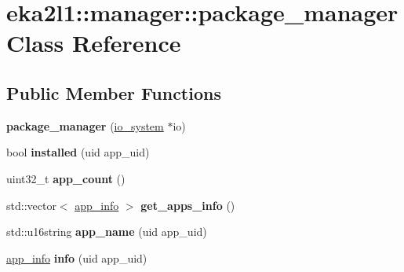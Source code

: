 \hypertarget{classeka2l1_1_1manager_1_1package__manager}{}\section{eka2l1\+:\+:manager\+:\+:package\+\_\+manager Class Reference}
\label{classeka2l1_1_1manager_1_1package__manager}
\subsection*{Public Member Functions}
\begin{DoxyCompactItemize}
\item 
\mbox{\label{classeka2l1_1_1manager_1_1package__manager_ac16df897346eb911aa5f5313ce0918c9}} 
{\bfseries package\+\_\+manager} (\mbox{\hyperlink{classeka2l1_1_1io__system}{io\+\_\+system}} $\ast$io)
\item 
\mbox{\label{classeka2l1_1_1manager_1_1package__manager_a5f26e1e8f16540f7dcc29428c35f3742}} 
bool {\bfseries installed} (uid app\+\_\+uid)
\item 
\mbox{\label{classeka2l1_1_1manager_1_1package__manager_a1e3fb359485ccef87329c592b29d48c6}} 
uint32\+\_\+t {\bfseries app\+\_\+count} ()
\item 
\mbox{\label{classeka2l1_1_1manager_1_1package__manager_ab75114a675ad0d8e5945686d4678aea3}} 
std\+::vector$<$ \mbox{\hyperlink{structeka2l1_1_1manager_1_1app__info}{app\+\_\+info}} $>$ {\bfseries get\+\_\+apps\+\_\+info} ()
\item 
\mbox{\label{classeka2l1_1_1manager_1_1package__manager_acfe29ecbcabbe274269140b0e4b64051}} 
std\+::u16string {\bfseries app\+\_\+name} (uid app\+\_\+uid)
\item 
\mbox{\label{classeka2l1_1_1manager_1_1package__manager_a90fd82347889b03e8c34737f2e787285}} 
\mbox{\hyperlink{structeka2l1_1_1manager_1_1app__info}{app\+\_\+info}} {\bfseries info} (uid app\+\_\+uid)
\item 

\end{DoxyCompactItemize}
